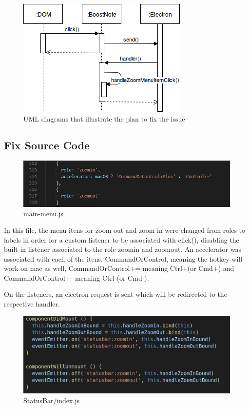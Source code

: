 \documentclass[main.tex]{subfiles}
\begin{document}
\begin{figure}[h]
\includegraphics[scale=0.9]{images/dyagram-2554.png}
\centering
\caption{UML diagrams that illustrate the plan to fix the issue}
\end{figure}

\clearpage

\subsection{Fix Source Code}

\begin{figure}[h]
\includegraphics[scale=0.6]{images/mainMenu.png}
\centering
\caption{main-menu.js}
\label{fig:main-menu.js}
\end{figure}

In this file, the menu itens for zoom out and zoom in were changed from roles to labels in order for a custom listener to be associated with click(), disabling the built in listener associated to the role zoomin and zoomout. An accelerator was associated with each of the itens, CommandOrControl, meaning the hotkey will work on mac as well, CommandOrControl+= meaning Ctrl+(or Cmd+) and CommandOrControl+- meaning Ctrl-(or Cmd-).

On the listeners, an electron request is sent which will be redirected to the respective handler.

\begin{figure}[h]
\includegraphics[scale=0.9]{images/statusBar.png}
\centering
\caption{StatusBar/index.js}
\end{figure}
\end{document}
